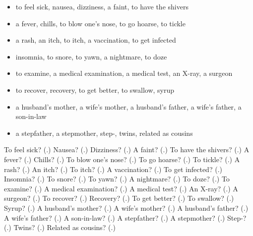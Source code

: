 \begin{itemize}
\raggedright
  \item to feel sick, nausea, dizziness, a faint, to have the shivers
  \item a fever, chills, to blow one's nose, to go hoarse, to tickle
  \item a rash, an itch, to itch, a vaccination, to get infected
  \item insomnia, to snore, to yawn, a nightmare, to doze
  \item to examine, a medical examination, a medical test, an X-ray, a surgeon
  \item to recover, recovery, to get better, to swallow, syrup
  \item a husband's mother, a wife's mother, a husband's father, a wife's father, a son-in-law
  \item a stepfather, a stepmother, step-, twins, related as cousins
\end{itemize}

\begin{tcolorbox}[breakable,colback=teal!4,colframe=teal!35!black,title={Before you move on}]
To feel sick? (\textbf{}.) Nausea? (\textbf{}.) Dizziness? (\textbf{}.) A faint? (\textbf{}.) To have the shivers? (\textbf{}.) A fever? (\textbf{}.) Chills? (\textbf{}.) To blow one's nose? (\textbf{}.) To go hoarse? (\textbf{}.) To tickle? (\textbf{}.) A rash? (\textbf{}.) An itch? (\textbf{}.) To itch? (\textbf{}.) A vaccination? (\textbf{}.) To get infected? (\textbf{}.) Insomnia? (\textbf{}.) To snore? (\textbf{}.) To yawn? (\textbf{}.) A nightmare? (\textbf{}.) To doze? (\textbf{}.) To examine? (\textbf{}.) A medical examination? (\textbf{}.) A medical test? (\textbf{}.) An X-ray? (\textbf{}.) A surgeon? (\textbf{}.) To recover? (\textbf{}.) Recovery? (\textbf{}.) To get better? (\textbf{}.) To swallow? (\textbf{}.) Syrup? (\textbf{}.) A husband's mother? (\textbf{}.) A wife's mother? (\textbf{}.) A husband's father? (\textbf{}.) A wife's father? (\textbf{}.) A son-in-law? (\textbf{}.) A stepfather? (\textbf{}.) A stepmother? (\textbf{}.) Step-? (\textbf{}.) Twins? (\textbf{}.) Related as cousins? (\textbf{}.)
\end{tcolorbox}
